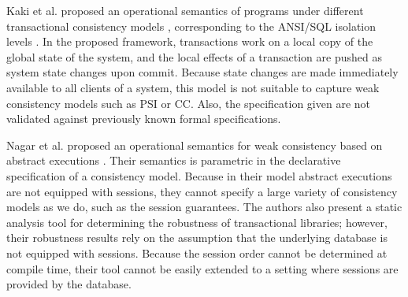 Kaki et al. proposed an operational semantics of programs 
under different transactional consistency models \cite{alonetogether}, 
corresponding to the ANSI/SQL isolation levels \cite{si}.
In the proposed framework, transactions work on a local copy of the global state 
of the system, and the local effects of a transaction are pushed as 
system state changes upon commit. Because state changes 
are made immediately available to all clients of a system, this model 
is not suitable to capture weak consistency models such as PSI or CC. 
Also, the specification given are not validated against previously known 
formal specifications.

Nagar et al. proposed an operational semantics for weak consistency 
based on abstract executions \cite{sureshConcur}. Their semantics 
is parametric in the declarative specification of a consistency model. Because 
in their model abstract executions are not equipped with sessions, they cannot 
specify a large variety of consistency models as we do, such as the session guarantees. 
The authors also present a static analysis tool for determining the robustness of transactional 
libraries; however, their robustness results rely on the assumption that the underlying database 
is not equipped with sessions. Because the session order cannot be determined at compile time, 
their tool cannot be easily extended to a setting where sessions are provided by the database. 


